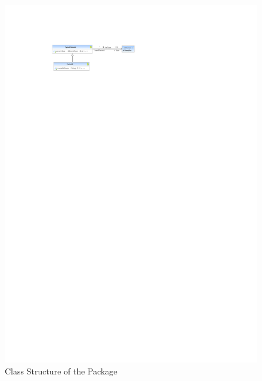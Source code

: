 %
%

\begin{figure}[htbp]
  \centering
  \includegraphics[scale=2]{figures/A_technical-reference/packages/storydiagrams/storydiagrams}
  \caption{Class Structure of the  Package}
  \label{fig:MM:storydiagrams}
\end{figure}

